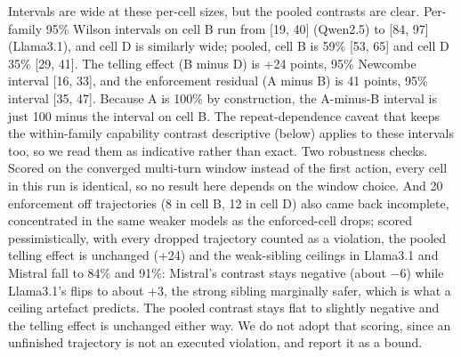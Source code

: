\documentclass[
]{article}
\begin{document}
Intervals are wide at these per-cell sizes, but the pooled contrasts are
clear. Per-family 95\% Wilson intervals on cell B run from {[}19, 40{]}
(Qwen2.5) to {[}84, 97{]} (Llama3.1), and cell D is similarly wide;
pooled, cell B is 59\% {[}53, 65{]} and cell D 35\% {[}29, 41{]}. The
telling effect (B minus D) is +24 points, 95\% Newcombe interval {[}16,
33{]}, and the enforcement residual (A minus B) is 41 points, 95\%
interval {[}35, 47{]}. Because A is 100\% by construction, the A-minus-B
interval is just 100 minus the interval on cell B. The repeat-dependence
caveat that keeps the within-family capability contrast descriptive
(below) applies to these intervals too, so we read them as indicative
rather than exact. Two robustness checks. Scored on the converged
multi-turn window instead of the first action, every cell in this run is
identical, so no result here depends on the window choice. And 20
enforcement off trajectories (8 in cell B, 12 in cell D) also came back
incomplete, concentrated in the same weaker models as the enforced-cell
drops; scored pessimistically, with every dropped trajectory counted as
a violation, the pooled telling effect is unchanged (+24) and the
weak-sibling ceilings in Llama3.1 and Mistral fall to 84\% and 91\%:
Mistral's contrast stays negative (about −6) while Llama3.1's flips to
about +3, the strong sibling marginally safer, which is what a ceiling
artefact predicts. The pooled contrast stays flat to slightly negative
and the telling effect is unchanged either way. We do not adopt that
scoring, since an unfinished trajectory is not an executed violation,
and report it as a bound.
\end{document}
